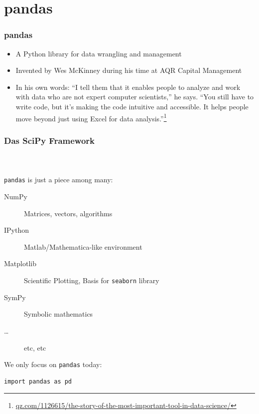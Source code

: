 \documentclass[english]{beamer}
\begin{document}
\section{pandas}

\begin{frame}
\frametitle{pandas}

\begin{itemize}
	\item A Python library for data wrangling and management
	\item Invented by Wes McKinney during his time at AQR Capital Management
	\item In his own words:
\enquote{I tell them that it enables people to analyze and work with data who are not expert computer scientists,} he says. \enquote{You still have to write code, but it’s making the code intuitive and accessible. It helps people move beyond just using Excel for data analysis.}\footnote{\url{qz.com/1126615/the-story-of-the-most-important-tool-in-data-science/}}
\end{itemize}

\end{frame}



\begin{frame}[containsverbatim]
\frametitle{Das SciPy Framework}
\framesubtitle{~}

\texttt{pandas} is just a piece among many:\vspace*{1em}

\begin{description}
\item[NumPy] Matrices, vectors, algorithms
\item[IPython] Matlab/Mathematica-like environment
\item[Matplotlib] Scientific Plotting, Basis for \texttt{seaborn} library
\item[SymPy] Symbolic mathematics
\item [\ldots] etc, etc
\end{description}\vspace*{0.5em}

We only focus on \texttt{pandas} today:

\begin{lstlisting}
import pandas as pd
\end{lstlisting}

\end{frame}
\end{document}
